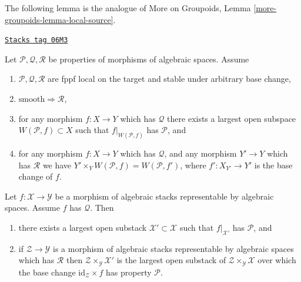 The following lemma is the analogue of
More on Groupoids, Lemma \ref{more-groupoids-lemma-local-source}.

\begin{lemma}
\label{stacks-properties-lemma-local-source}
\href{https://stacks.math.columbia.edu/tag/06M3}{\texttt{Stacks tag 06M3}}

Let $\mathcal{P}, \mathcal{Q}, \mathcal{R}$ be properties of morphisms
of algebraic spaces. Assume
\begin{enumerate}
\item $\mathcal{P}, \mathcal{Q}, \mathcal{R}$ are fppf local on the target
and stable under arbitrary base change,
\item $\text{smooth} \Rightarrow \mathcal{R}$,
\item for any morphism $f : X \to Y$ which has $\mathcal{Q}$ there exists a
largest open subspace $W(\mathcal{P}, f) \subset X$ such that
$f|_{W(\mathcal{P}, f)}$ has $\mathcal{P}$, and
\item for any morphism $f : X \to Y$ which has $\mathcal{Q}$,
and any morphism $Y' \to Y$ which has $\mathcal{R}$ we have
$Y' \times_Y W(\mathcal{P}, f) = W(\mathcal{P}, f')$, where
$f' : X_{Y'} \to Y'$ is the base change of $f$.
\end{enumerate}
Let $f : \mathcal{X} \to \mathcal{Y}$ be a morphism of algebraic stacks
representable by algebraic spaces. Assume $f$ has $\mathcal{Q}$. Then
\begin{enumerate}
\item[(A)] there exists a largest open substack
$\mathcal{X}' \subset \mathcal{X}$ such that $f|_{\mathcal{X}'}$ has
$\mathcal{P}$, and
\item[(B)] if $\mathcal{Z} \to \mathcal{Y}$ is a morphism of algebraic
stacks representable by algebraic spaces which has $\mathcal{R}$
then $\mathcal{Z} \times_\mathcal{Y} \mathcal{X}'$ is the largest open
substack of $\mathcal{Z} \times_\mathcal{Y} \mathcal{X}$ over which
the base change $\text{id}_\mathcal{Z} \times f$ has property $\mathcal{P}$.
\end{enumerate}
\end{lemma}

